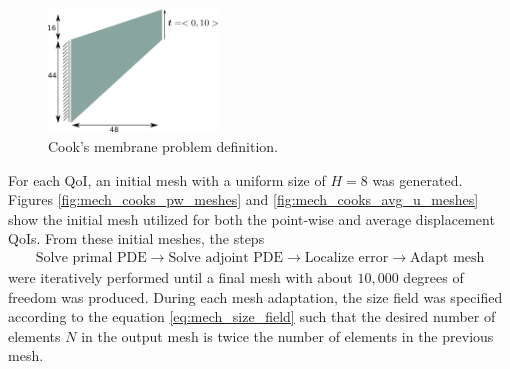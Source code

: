 \begin{figure}[ht!]
\centering
\includegraphics[width=0.4\textwidth]{img/mech_cooks_geom.png}
\caption{Cook's membrane problem definition.}
\label{fig:cooks_geom}
\end{figure}

For each QoI, an initial mesh with a uniform size of $H=8$
was generated. Figures \ref{fig:mech_cooks_pw_meshes} and
\ref{fig:mech_cooks_avg_u_meshes} show the initial mesh utilized for both
the point-wise and average displacement QoIs. From these initial meshes,
the steps
%
\begin{gather*}
\text{Solve primal PDE} \rightarrow
\text{Solve adjoint PDE} \rightarrow
\text{Localize error} \rightarrow
\text{Adapt mesh}
\end{gather*}
%
were iteratively performed until a final mesh with about $10,000$ degrees
of freedom was produced. During each mesh adaptation, the size field was
specified according to the equation \eqref{eq:mech_size_field} such that
the desired number of elements $N$ in the output mesh is twice the number
of elements in the previous mesh.

